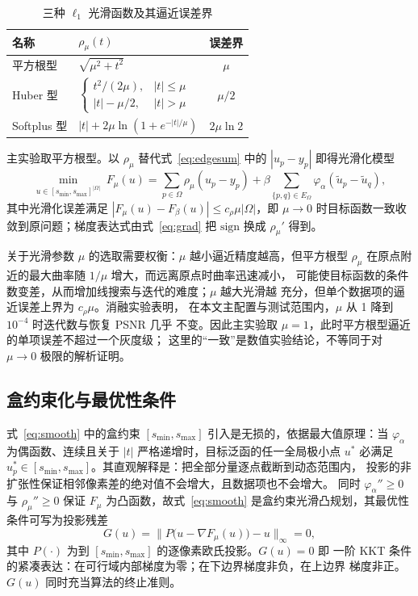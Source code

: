 \documentclass[withoutpreface,bwprint]{cumcmthesis}
\begin{document}
\begin{table}[!htbp]
  \centering\small
  \caption{三种 $\ell_1$ 光滑函数及其逼近误差界}
  \label{tab:rho}
  \begin{tabular}{llc}
    \toprule[1.5pt]
    名称 & $\rho_{\mu}(t)$ & 误差界 \\
    \midrule[1pt]
    平方根型 & $\sqrt{\mu^{2}+t^{2}}$ & $\mu$ \\
    Huber 型 & $\begin{cases}t^{2}/(2\mu), & |t|\le\mu\\ |t|-\mu/2, & |t|>\mu\end{cases}$ & $\mu/2$ \\
    Softplus 型 & $|t|+2\mu\ln(1+e^{-|t|/\mu})$ & $2\mu\ln 2$ \\
    \bottomrule[1.5pt]
  \end{tabular}
\end{table}

主实验取平方根型。以 $\rho_{\mu}$ 替代式~\eqref{eq:edgesum} 中的 $|u_p-y_p|$
即得光滑化模型
\begin{equation}
  \min_{u\in[s_{\min},s_{\max}]^{|\Omega|}}\ F_{\mu}(u)
  =\sum_{p\in\Omega}\rho_{\mu}(u_p-y_p)
  +\beta\sum_{\{p,q\}\in E_{\Omega}}\varphi_{\alpha}(\tilde u_p-\tilde u_q),
  \label{eq:smooth}
\end{equation}
其中光滑化误差满足 $|F_{\mu}(u)-F_{\beta}(u)|\le c_{\rho}\mu|\Omega|$，即
$\mu\to0$ 时目标函数一致收敛到原问题；梯度表达式由式~\eqref{eq:grad} 把
$\mathrm{sign}$ 换成 $\rho_{\mu}'$ 得到。

关于光滑参数 $\mu$ 的选取需要权衡：$\mu$ 越小逼近精度越高，但平方根型
$\rho_{\mu}$ 在原点附近的最大曲率随 $1/\mu$ 增大，而远离原点时曲率迅速减小，
可能使目标函数的条件数变差，从而增加线搜索与迭代的难度；$\mu$ 越大光滑越
充分，但单个数据项的逼近误差上界为 $c_{\rho}\mu$。消融实验表明，
在本文主配置与测试范围内，$\mu$ 从 1 降到 $10^{-4}$ 时迭代数与恢复 PSNR 几乎
不变。因此主实验取 $\mu=1$，此时平方根型逼近的单项误差不超过一个灰度级；
这里的“一致”是数值实验结论，不等同于对 $\mu\to0$ 极限的解析证明。

\subsection{盒约束化与最优性条件}

式~\eqref{eq:smooth} 中的盒约束 $[s_{\min},s_{\max}]$ 引入是无损的，依据最大值原理：当 $\varphi_{\alpha}$ 为偶函数、连续且关于
$|t|$ 严格递增时，目标泛函的任一全局极小点 $u^*$ 必满足
$u_p^{*}\in[s_{\min},s_{\max}]$。其直观解释是：把全部分量逐点截断到动态范围内，
投影的非扩张性保证相邻像素差的绝对值不会增大，且数据项也不会增大。
同时 $\varphi_{\alpha}''\ge0$ 与 $\rho_{\mu}''\ge0$
保证 $F_{\mu}$ 为凸函数，故式~\eqref{eq:smooth} 是盒约束光滑凸规划，其最优性
条件可写为投影残差
\begin{equation}
  G(u)=\big\|P\big(u-\nabla F_{\mu}(u)\big)-u\big\|_{\infty}=0,
\end{equation}
其中 $P(\cdot)$ 为到 $[s_{\min},s_{\max}]$ 的逐像素欧氏投影。$G(u)=0$ 即
一阶 KKT 条件的紧凑表达：在可行域内部梯度为零；在下边界梯度非负，在上边界
梯度非正。
$G(u)$ 同时充当算法的终止准则。
\end{document}
